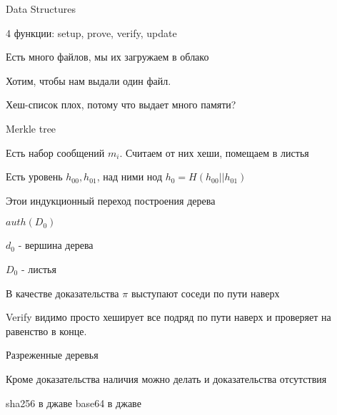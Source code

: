 \begin{para}{Data Structures}

4 функции: setup, prove, verify, update

Есть много файлов, мы их загружаем в облако

Хотим, чтобы нам выдали один файл.

Хеш-список плох, потому что выдает много памяти?

\begin{defe}{Merkle tree}

Есть набор сообщений $m_i$. Считаем от них хеши, помещаем в листья

Есть уровень $h_{00}, h_{01}$, над ними нод $h_0 = H(h_{00} || h_{01})$

Этои индукционный переход построения дерева

$auth(D_0)$

$d_0$ - вершина дерева

$D_0$ - листья

В качестве доказательства $\pi$ выступают соседи по пути наверх

Verify видимо просто хеширует все подряд по пути наверх и проверяет на равенство в конце.

\end{defe}

Разреженные деревья

Кроме доказательства наличия можно делать и доказательства отсутствия

\end{para}

sha256 в джаве
base64 в джаве






